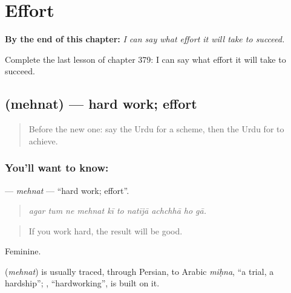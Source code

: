 
\chapter{Effort}
\label{ch:ur-effort}

\begin{chapteropening}
\textbf{By the end of this chapter:} \emph{I can say what effort it will take to succeed.}

Complete the last lesson of chapter 379: I can say what effort it will take to succeed.
\end{chapteropening}

\section[\texorpdfstring{\ur{محنت} (mehnat)}{محنت (mehnat)}]{ (mehnat) — hard work; effort}

\label{lesson:UR-C379-mehnat}



\begin{quote}
Before the new one: say the Urdu for a scheme, then the Urdu for to achieve.
\end{quote}

\subsection*{You'll want to know: }
\textbf{} — \emph{mehnat} — \textquotedblleft{}hard work; effort\textquotedblright{}.

\begin{quote}
         
\end{quote}

\begin{quote}
\emph{agar tum ne mehnat kī to natījā achchhā ho gā.}
\end{quote}

\begin{quote}
If you work hard, the result will be good.
\end{quote}

Feminine.

\begin{cousinweb}
\textbf{} (\emph{mehnat}) is usually traced, through Persian, to Arabic \emph{miḥna}, \textquotedblleft{}a trial, a hardship\textquotedblright{}; \textbf{}, \textquotedblleft{}hardworking\textquotedblright{}, is built on it.
\end{cousinweb}

